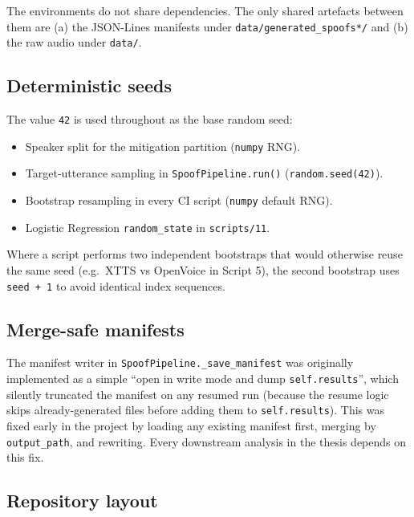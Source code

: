 The environments do not share dependencies. The only shared
artefacts between them are (a) the JSON-Lines manifests under
\texttt{data/generated\_spoofs*/} and (b) the raw audio under
\texttt{data/}.

\subsection{Deterministic seeds}
\label{sec:methodology-repro-seeds}

The value \texttt{42} is used throughout as the base random seed:

\begin{itemize}
    \item Speaker split for the mitigation partition (\texttt{numpy} RNG).
    \item Target-utterance sampling in \texttt{SpoofPipeline.run()}
        (\texttt{random.seed(42)}).
    \item Bootstrap resampling in every CI script (\texttt{numpy} default RNG).
    \item Logistic Regression \texttt{random\_state} in \texttt{scripts/11}.
\end{itemize}

Where a script performs two independent bootstraps that would
otherwise reuse the same seed (e.g.\ XTTS vs OpenVoice in Script 5),
the second bootstrap uses \texttt{seed + 1} to avoid identical index
sequences.

\subsection{Merge-safe manifests}
\label{sec:methodology-repro-manifests}

The manifest writer in \texttt{SpoofPipeline.\_save\_manifest} was
originally implemented as a simple ``open in write mode and dump
\texttt{self.results}'', which silently truncated the manifest on
any resumed run (because the resume logic skips already-generated
files before adding them to \texttt{self.results}). This was fixed
early in the project by loading any existing manifest first, merging
by \texttt{output\_path}, and rewriting. Every downstream analysis
in the thesis depends on this fix.

\subsection{Repository layout}
\label{sec:methodology-repro-layout}

